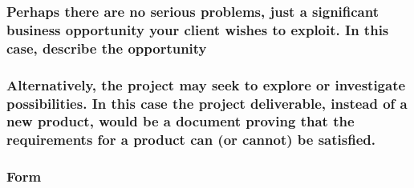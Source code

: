 \documentclass[
]{article}
\begin{document}
\hypertarget{perhaps-there-are-no-serious-problems-just-a-significant-business-opportunity-your-client-wishes-to-exploit.-in-this-case-describe-the-opportunity}{%
\subsubsection{\texorpdfstring{Perhaps there are no serious problems,
just a significant business opportunity your client wishes to exploit.
In this case, describe the opportunity
}{Perhaps there are no serious problems, just a significant business opportunity your client wishes to exploit. In this case, describe the opportunity }}\label{perhaps-there-are-no-serious-problems-just-a-significant-business-opportunity-your-client-wishes-to-exploit.-in-this-case-describe-the-opportunity}}

\hypertarget{alternatively-the-project-may-seek-to-explore-or-investigate-possibilities.-in-this-case-the-project-deliverable-instead-of-a-new-product-would-be-a-document-proving-that-the-requirements-for-a-product-can-or-cannot-be-satisfied.}{%
\subsubsection{\texorpdfstring{Alternatively, the project may seek to
explore or investigate possibilities. In this case the project
deliverable, instead of a new product, would be a document proving that
the requirements for a product can (or cannot) be satisfied.
}{Alternatively, the project may seek to explore or investigate possibilities. In this case the project deliverable, instead of a new product, would be a document proving that the requirements for a product can (or cannot) be satisfied. }}\label{alternatively-the-project-may-seek-to-explore-or-investigate-possibilities.-in-this-case-the-project-deliverable-instead-of-a-new-product-would-be-a-document-proving-that-the-requirements-for-a-product-can-or-cannot-be-satisfied.}}

\hypertarget{form}{%
\subsubsection{Form}\label{form}}
\end{document}
